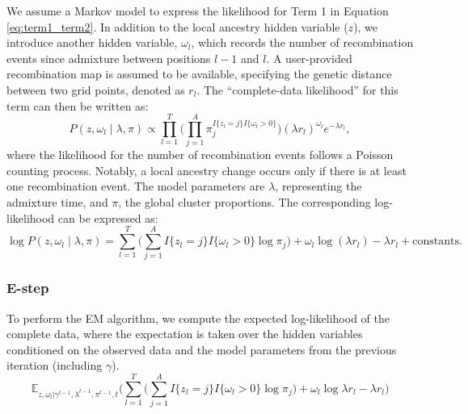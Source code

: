 We assume a Markov model to express the likelihood for Term 1 in Equation \ref{eq:term1_term2}. In addition to the local ancestry hidden variable (\( z \)), we introduce another hidden variable, \( \omega_l \), which records the number of recombination events since admixture between positions \( l-1 \) and \( l \). A user-provided recombination map is assumed to be available, specifying the genetic distance between two grid points, denoted as \( r_l \). The ``complete-data likelihood'' for this term can then be written as:
\begin{equation}
    P(z, \omega_l \mid \lambda, \pi) \propto \prod\limits_{l=1}^{T} \Big( \prod\limits_{j=1}^{A} \pi_j^{I\{z_l = j\} I\{\omega_l > 0\}} \Big) (\lambda r_l)^{\omega_l} e^{-\lambda r_l},
\end{equation}
where the likelihood for the number of recombination events follows a Poisson counting process. Notably, a local ancestry change occurs only if there is at least one recombination event. The model parameters are \( \lambda \), representing the admixture time, and \( \pi \), the global cluster proportions. The corresponding log-likelihood can be expressed as:
\begin{equation}
    \log P(z, \omega_l \mid \lambda, \pi) = \sum\limits_{l=1}^{T} \Big( \sum\limits_{j=1}^{A} I\{z_l = j\} I\{\omega_l > 0\} \log \pi_j \Big) + \omega_l \log (\lambda r_l) - \lambda r_l + \text{constants}.
\end{equation}

\subsubsection{E-step}
\label{sec:term2_estep}

To perform the EM algorithm, we compute the expected log-likelihood of the complete data, where the expectation is taken over the hidden variables conditioned on the observed data and the model parameters from the previous iteration (including $\gamma$).
\begin{equation}
    \mathbb{E}_{z, \omega_l \vert \gamma^{t-1}, \lambda^{t-1}, \pi^{t-1}, t}\Big( \sum\limits_{l=1}^{T} \Big( \sum\limits_{j=1}^{A} I\{z_l = j\} I\{\omega_l > 0\} \log \pi_j \Big) + \omega_l \log \lambda r_l - \lambda r_l \Big)
\end{equation}

